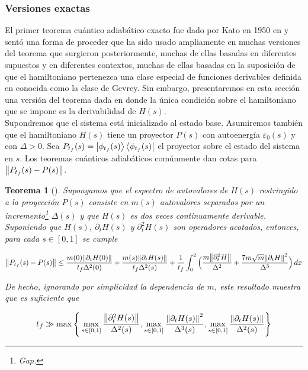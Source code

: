 \documentclass[11pt, spanish]{report}
\numberwithin{equation}{section}
\newtheorem{teo}[defin]{Teorema}
\numberwithin{defin}{section}
\begin{document}
\begin{appendices}
\subsubsection*{Versiones exactas}
El primer teorema cuántico adiabático exacto fue dado por Kato en 1950 en \cite{doi:10.1143/JPSJ.5.435} y sentó una forma de proceder que ha sido usado ampliamente en muchas versiones del teorema que surgieron posteriormente, muchas de ellas basadas en diferentes supuestos y en diferentes contextos, muchas de ellas basadas en la suposición de que el hamiltoniano pertenezca una clase especial de funciones derivables definida en \cite{gevrey1918nature} conocida como la clase de Gevrey. Sin embargo, presentaremos en esta sección una versión del teorema dada en \cite{2007JMP....48j2111J} donde la única condición sobre el hamiltoniano que se impone es la derivabilidad de $H(s)$.\\

Supondremos que el sistema está inicializado al estado base. Asumiremos también que el hamiltoniano $H(s)$ tiene un proyector $P(s)$ con autoenergía $\varepsilon_0(s)$ y con $\Delta>0$. Sea $P_{t_f}(s)=\ket{\phi_{t_f}(s)}\bra{\phi_{t_f}(s)}$ el proyector sobre el estado del sistema en $s$. Los teoremas cuánticos adiabáticos comúnmente dan cotas para $\norm{P_{t_f}(s)-P(s)}$.

\begin{teo}[\cite{2007JMP....48j2111J}] Supongamos que el espectro de autovalores de $H(s)$ restringido a la proyección $P(s)$ consiste en $m(s)$ autovalores separados por un \emph{incremento}\footnote{Gap.} $\Delta(s)$ y que $H(s)$ es dos veces continuamente derivable. Suponiendo que $H(s),\ \partial_tH(s)$ y $\partial^2_tH(s)$ son operadores acotados, entonces, para cada $s\in[0,1]$ se cumple

\begin{equation}
\norm{P_{t_f}(s)-P(s)}\leq \frac{m(0)\norm{\partial_tH(0)}}{t_f\Delta^2(0)}+\frac{m(s)\norm{\partial_tH(s)}}{t_f\Delta^2(s)}+\frac{1}{t_f}\int_0^2\Big(\frac{m\norm{\partial^2_tH}}{\Delta^2}+\frac{7m\sqrt{m}\norm{\partial_tH}^2}{\Delta^3}\Big)\,dx
\end{equation}

De hecho, ignorando por simplicidad la dependencia de $m$, este resultado muestra que es suficiente que

\begin{equation}
t_f\gg\max\Bigg\{\max_{s\in[0,1]} \frac{\norm{\partial^2_tH(s)}}{\Delta^2(s)},\max_{s\in[0,1]} \frac{\norm{\partial_tH(s)}^2}{\Delta^3(s)},\max_{s\in[0,1]} \frac{\norm{\partial_tH(s)}}{\Delta^2(s)}\Bigg\}
\end{equation}
\end{teo}


\end{appendices}
\end{document}
